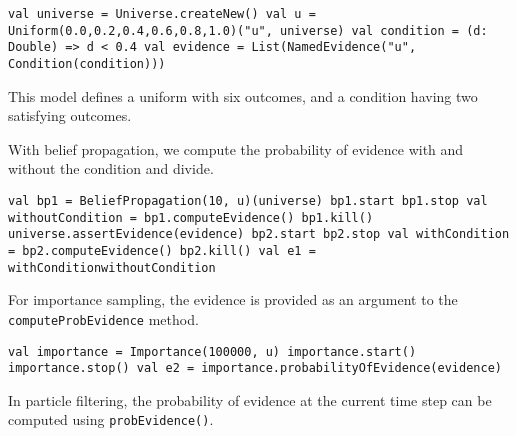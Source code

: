 \begin{flushleft}
    \texttt{val universe = Universe.createNew()
    \newline val u = Uniform(0.0,0.2,0.4,0.6,0.8,1.0)("u", universe)
    \newline val condition = (d: Double) => d < 0.4
    \newline val evidence = List(NamedEvidence("u", Condition(condition)))
}
\end{flushleft}

This model defines a uniform with six outcomes, and a condition having two satisfying outcomes.

With belief propagation, we compute the probability of evidence with and without the condition and divide.

\begin{flushleft}
\texttt{val bp1 = BeliefPropagation(10, u)(universe)
    \newline bp1.start
    \newline bp1.stop
    \newline val withoutCondition = bp1.computeEvidence()
    \newline bp1.kill()
    \newline 
    \newline universe.assertEvidence(evidence)
    \newline bp2.start
    \newline bp2.stop
    \newline val withCondition = bp2.computeEvidence()
    \newline bp2.kill()
    \newline val e1 = withConditionwithoutCondition
}
\end{flushleft}

For importance sampling, the evidence is provided as an argument to the \texttt{computeProbEvidence} method.

\begin{flushleft}
    \texttt{val importance = Importance(100000, u)
    \newline importance.start()
    \newline importance.stop()
    \newline val e2 = importance.probabilityOfEvidence(evidence)
  }
\end{flushleft}

In particle filtering, the probability of evidence at the current time step can be computed using \texttt{probEvidence()}.

